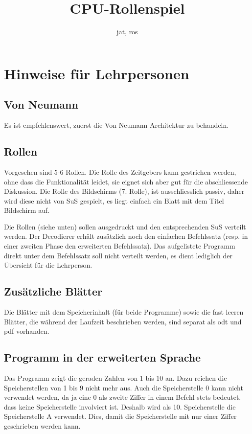 \documentclass[a4paper]{kinet-intern}
\author{jat, ros}
\title{CPU-Rollenspiel}
\begin{document}
\maketitle

\newcommand{\voice}[1]{\textbf{\dq{}#1\dq{}}}

\section*{Hinweise für Lehrpersonen}
\subsection*{Von Neumann}
Es ist empfehlenswert, zuerst die Von-Neumann-Architektur zu behandeln.

\subsection*{Rollen}
Vorgesehen sind 5-6 Rollen. Die Rolle des Zeitgebers kann gestrichen werden, ohne dass die Funktionalität leidet, sie eignet sich aber gut für die abschliessende Diskussion. Die Rolle des Bildschirms (7. Rolle), ist ausschliesslich passiv, daher wird diese nicht von SuS gespielt, es liegt einfach ein Blatt mit dem Titel \dq{}Bildschirm\dq{} auf.

Die Rollen (siehe unten) sollen ausgedruckt und den entsprechenden SuS verteilt werden. Der Decodierer erhält zusätzlich noch den einfachen Befehlssatz (resp. in einer zweiten Phase den erweiterten Befehlssatz). Das aufgelistete Programm direkt unter dem Befehlssatz soll nicht verteilt werden, es dient lediglich der Übersicht für die Lehrperson.

\subsection*{Zusätzliche Blätter}
Die Blätter mit dem Speicherinhalt (für beide Programme) sowie die fast leeren Blätter, die während der Laufzeit beschrieben werden, sind separat als odt und pdf vorhanden.

\subsection*{Programm in der erweiterten Sprache}
Das Programm zeigt die geraden Zahlen von 1 bis 10 an. Dazu reichen die Speicherstellen von 1 bis 9 nicht mehr aus. Auch die Speicherstelle 0 kann nicht verwendet werden, da ja eine 0 als zweite Ziffer in einem Befehl stets bedeutet, dass keine Speicherstelle involviert ist. Deshalb wird als 10. Speicherstelle die Speicherstelle A verwendet. Dies, damit die Speicherstelle mit nur einer \dq{}Ziffer\dq{} geschrieben werden kann.
\end{document}
